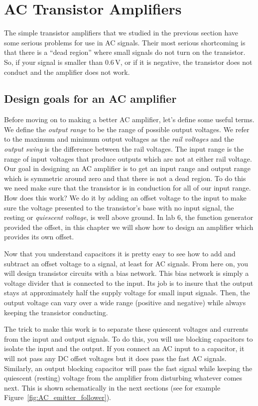 \documentclass{article}
\begin{document}
\section{AC Transistor Amplifiers}
The simple transistor amplifiers that we studied in the previous section have some serious problems for use in AC signals. Their most serious shortcoming is that there is a ``dead region'' where small signals do not turn on the transistor. So, if your signal is smaller than 0.6\,V, or if it is negative, the transistor does not conduct and the amplifier does not work. 

\subsection{Design goals for an AC amplifier}
Before moving on to making a better AC amplifier, let's define some useful terms. We define the \emph{output range} to be the range of possible output voltages. We refer to the maximum and minimum output voltages as the \emph{rail voltages} and the \emph{output swing} is the difference between the rail voltages. The input range is the range of input voltages that produce outputs which are not at either rail voltage. 
Our goal in designing an AC amplifier is to get an input range and output range which is symmetric around zero and  that there is not a dead region. To do this we need make sure that the transistor is in conduction for all of our input range. How does this work? We do it by adding an offset voltage to the input to make sure the voltage presented to the transistor's base with no input signal, the resting or \emph{quiescent voltage}, is well above ground. In lab 6, the function generator provided the offset, in this chapter we will show how to design an amplifier which provides its own offset.

Now that you understand capacitors it is pretty easy to see how to add and subtract an offset voltage to a signal, at least for AC signals. From here on, you will design transistor circuits with a bias network. This bias network is simply a voltage divider that is connected to the input. Its job is to insure that the output stays at approximately half the supply voltage for small input signals. Then, the output voltage can vary over a wide range (positive and negative) while always keeping the transistor conducting.

The trick to make this work is to separate these quiescent voltages and currents from the input and output signals. To do this, you will use blocking capacitors to isolate the input and the output. If you connect an AC input to a capacitor, it will not pass any DC offset voltages but it does pass the fast AC signals. Similarly, an output blocking capacitor will pass the fast signal while keeping the quiescent (resting) voltage from the amplifier from disturbing whatever comes next. This is shown schematically in the next sections (see for example Figure~\ref{fig:AC_emitter_follower}).
\end{document}

